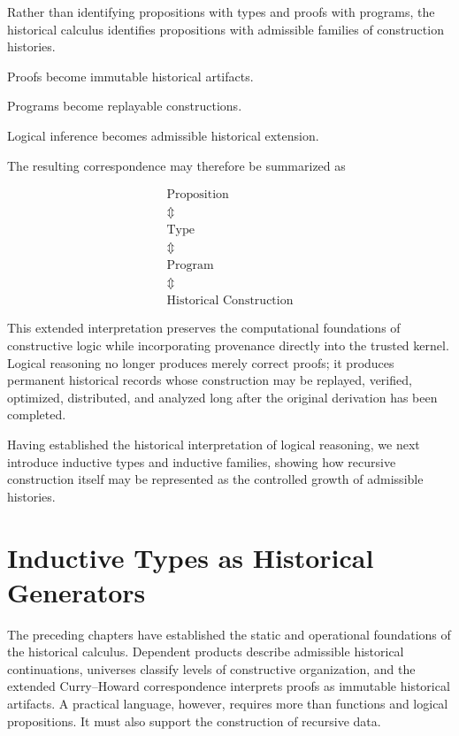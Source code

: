 \documentclass[12pt,oneside]{article}
\theoremstyle{definition}
\theoremstyle{remark}
\begin{document}
Rather than identifying propositions with types and proofs with programs, the
historical calculus identifies propositions with admissible families of
construction histories.

Proofs become immutable historical artifacts.

Programs become replayable constructions.

Logical inference becomes admissible historical extension.

The resulting correspondence may therefore be summarized as

\[
\boxed{
\begin{array}{c}
\text{Proposition}
\\[0.3em]
\Updownarrow
\\[0.3em]
\text{Type}
\\[0.3em]
\Updownarrow
\\[0.3em]
\text{Program}
\\[0.3em]
\Updownarrow
\\[0.3em]
\text{Historical Construction}
\end{array}
}
\]

This extended interpretation preserves the computational foundations of
constructive logic while incorporating provenance directly into the trusted
kernel. Logical reasoning no longer produces merely correct proofs; it produces
permanent historical records whose construction may be replayed, verified,
optimized, distributed, and analyzed long after the original derivation has
been completed.

Having established the historical interpretation of logical reasoning, we next
introduce inductive types and inductive families, showing how recursive
construction itself may be represented as the controlled growth of admissible
histories.

\section{Inductive Types as Historical Generators}

The preceding chapters have established the static and operational foundations
of the historical calculus. Dependent products describe admissible historical
continuations, universes classify levels of constructive organization, and the
extended Curry--Howard correspondence interprets proofs as immutable historical
artifacts. A practical language, however, requires more than functions and
logical propositions. It must also support the construction of recursive data.
\end{document}
